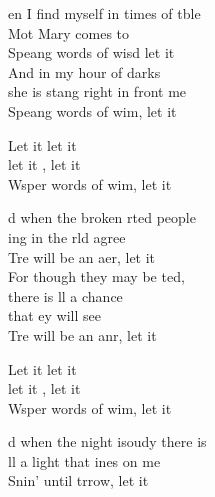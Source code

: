 \begin{cancion}%
	en I find myself in times of tble\\
	Mot Mary comes to  \\
	Speang words of wisd let it   \\
	And in my hour of darks\\
	she is stang right in front  me\\
	Speang words of wim, let it   \jump\\
	\begin{chorus}%
		Let it  let it  \\
		let it , let it  \\
		Wsper words of wim, let it  \jump\\
	\end{chorus}%
	\jump
	d when the broken rted people\\
	ing in the rld agree\\
	Tre will be an aer, let it   \\
	For though they may be ted, \\
	there is ll a chance \\
	that ey will see\\
	Tre will be an anr, let it   \jump\\
	\begin{chorus}%
		Let it  let it \chord{Sol}{}{be,} \\
		let it , let it \chord{Do}{}{be} \\
		Wsper words of wim, let it  \jump\\
	\end{chorus}%
	d when the night isoudy there is\\
	ll a light that ines on me\\
	Snin' until trrow, let it   \\

\end{cancion}
